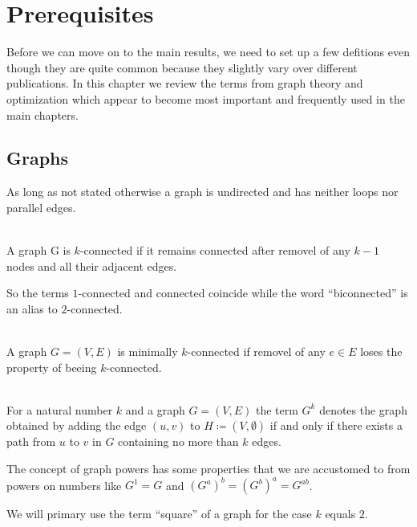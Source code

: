 \chapter{Prerequisites}
Before we can move on to the main results, we need to set up a few defitions even though they are quite common because they slightly vary over different publications. In this chapter we review the terms from graph theory and optimization which appear to become most important and frequently used in the main chapters.

\section{Graphs}
As long as not stated otherwise a graph is undirected and has neither loops nor parallel edges.

\begin{definition} [\(k\)-connected]\label{def:k_connected}\ \\
  A graph G is \(k\)-connected if it remains connected after removel of any \(k-1\) nodes and all their adjacent edges.
\end{definition}

So the terms \(1\)-connected and connected coincide while the word \enquote{biconnected} is an alias to \(2\)-connected.

\begin{definition}\label{def:min_k_connected}\ \\
  A graph \(G = (V, E)\) is minimally \(k\)-connected if removel of any \(e \in E\) loses the property of beeing \(k\)-connected.
\end{definition}

\begin{definition}\label{def:power_of_graph}\ \\
  For a natural number \(k\) and a graph \(G = (V, E)\) the term \(G^{k}\) denotes the graph obtained by adding the edge \((u,v)\) to \(H \coloneqq (V, \emptyset)\) if and only if there exists a path from \(u\) to \(v\) in \(G\) containing no more than \(k\) edges.
\end{definition}

The concept of graph powers has some properties that we are accustomed to from powers on numbers like \(G^1 = G\) and \({(G^a)}^b = {(G^b)}^a = G^{ab}\).

We will primary use the term \enquote{square} of a graph for the case \(k\) equals \(2\).


